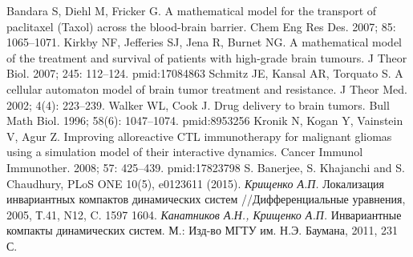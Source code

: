 \documentclass[12pt,a4paper]{extarticle}
\theoremstyle{definition}
\theoremstyle{definition}
\theoremstyle{definition}
\begin{document}
\begin{thebibliography}{6}
		Bandara S, Diehl M, Fricker G. A mathematical model for the transport of paclitaxel (Taxol) across the blood-brain barrier. Chem Eng Res Des. 2007; 85: 1065–1071.
		Kirkby NF, Jefferies SJ, Jena R, Burnet NG. A mathematical model of the treatment and survival of patients with high-grade brain tumours. J Theor Biol. 2007; 245: 112–124. pmid:17084863
		Schmitz JE, Kansal AR, Torquato S. A cellular automaton model of brain tumor treatment and resistance. J Theor Med. 2002; 4(4): 223–239.
		Walker WL, Cook J. Drug delivery to brain tumors. Bull Math Biol. 1996; 58(6): 1047–1074. pmid:8953256
		Kronik N, Kogan Y, Vainstein V, Agur Z. Improving alloreactive CTL immunotherapy for malignant gliomas using a simulation model of their interactive dynamics. Cancer Immunol Immunother. 2008; 57: 425–439. pmid:17823798
		S. Banerjee, S. Khajanchi and S. Chaudhury, PLoS ONE 10(5), e0123611 (2015). 
		\textit{Крищенко А.П.} Локализация инвариантных компактов динамических систем //Дифференциальные уравнения, 2005, Т.41, N12, C. 1597 1604.
		\textit{Канатников А.Н., Крищенко А.П.} Инвариантные компакты динамических систем. М.: Изд-во МГТУ им. Н.Э. Баумана, 2011, 231 С.
	\end{thebibliography}
\end{document}
